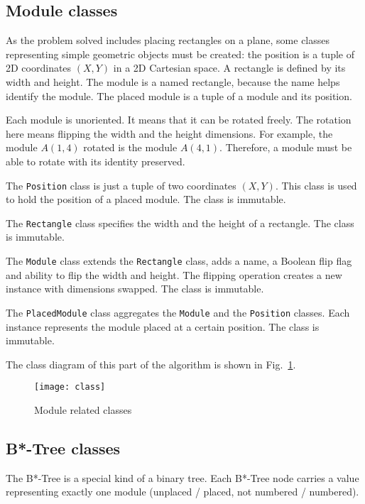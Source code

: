 \subsection{Module classes}

As the problem solved includes placing rectangles on a plane, some classes representing simple geometric objects must be created: the position is a tuple of 2D coordinates $(X, Y)$ in a 2D Cartesian space. A rectangle is defined by its width and height. The module is a named rectangle, because the name helps identify the module. The placed module is a tuple of a module and its position. 

Each module is unoriented. It means that it can be rotated freely. The rotation here means flipping the width and the height dimensions. For example, the module $A(1, 4)$ rotated is the module $A(4, 1)$. Therefore, a module must be able to rotate with its identity preserved.

The {\tt Position} class is just a tuple of two coordinates $(X, Y)$. This class is used to hold the position of a placed module. The class is immutable.

The {\tt Rectangle} class specifies the width and the height of a rectangle. The class is immutable.

The {\tt Module} class extends the {\tt Rectangle} class, adds a name, a Boolean flip flag and ability to flip the width and height. The flipping operation creates a new instance with dimensions swapped. The class is immutable.

The {\tt PlacedModule} class aggregates the {\tt Module} and the {\tt Position} classes. Each instance represents the module placed at a certain position. The class is immutable.

The class diagram of this part of the algorithm is shown in Fig.~\ref{fig:uml:module}.

\begin{figure}
\centering
\texttt{[image: class]}
\caption{Module related classes}
\label{fig:uml:module}
\end{figure}

\subsection{B*-Tree classes}

The B*-Tree is a special kind of a binary tree. Each B*-Tree node carries a value representing exactly one module (unplaced / placed, not numbered / numbered).

